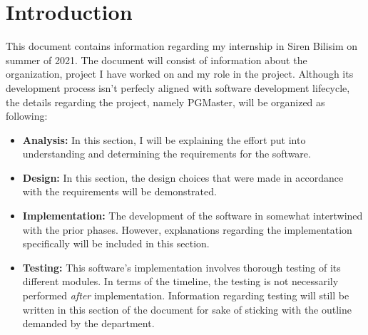 \chapter{Introduction}

This document contains information regarding my internship in Siren Bilisim 
on summer of 2021. The document will consist of information about the 
organization, project I have worked on and my role in the project. 
Although its development process isn't perfecly aligned with software 
development lifecycle, the details regarding the project, namely PGMaster, 
will be organized as following:

\begin{itemize}
    \item \textbf{Analysis:} In this section, I will be explaining the effort 
    put into understanding and determining the requirements for the software.
    \item \textbf{Design:} In this section, the design choices that were made 
    in accordance with the requirements will be demonstrated.
    \item \textbf{Implementation:} The development of the software in somewhat 
    intertwined with the prior phases. However, explanations regarding the 
    implementation specifically will be included in this section.
    \item \textbf{Testing:} This software's implementation involves thorough 
    testing of its different modules. In terms of the timeline, the testing is 
    not necessarily performed \textit{after} implementation. Information 
    regarding testing will still be written in this section of the document 
    for sake of sticking with the outline demanded by the department.
\end{itemize}

\par

